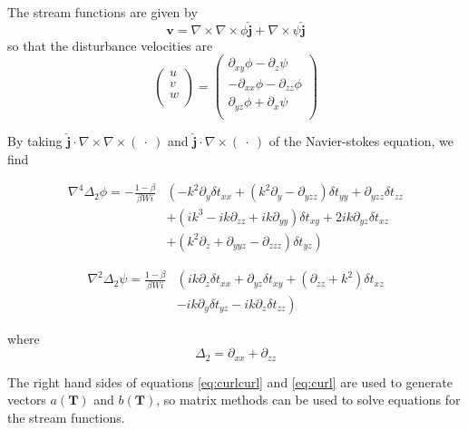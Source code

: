 \documentclass[12pt,a4paper]{article}
\newcommand{\stxx}{\delta t_{xx}}
\newcommand{\styy}{\delta t_{yy}}
\newcommand{\stzz}{\delta t_{zz}}
\newcommand{\stxy}{\delta t_{xy}}
\newcommand{\stxz}{\delta t_{xz}}
\newcommand{\styz}{\delta t_{yz}}
\newcommand{\curl}{\nabla \times}
\newcommand{\biharmop}{\nabla^{4}}
\newcommand{\dd}[1]{\partial_{#1}}
\begin{document}
The stream functions are given by 
\begin{equation}
    \mathbf{v} = \curl \curl \phi \hat{\mathbf{j}} + \curl \psi\hat{\mathbf{j}}
\end{equation}
so that the disturbance velocities are
\begin{equation}
    \begin{pmatrix}
	u \\
	v \\
	w \\
    \end{pmatrix}
    =
    \begin{pmatrix}
    \partial _{xy} \phi - \partial_{z} \psi \\
    -\partial_{xx} \phi - \partial_{zz} \phi \\
    \partial _{yz} \phi + \partial_{x} \psi \\
    \end{pmatrix}
    \label{eq:streamfunction_def}
\end{equation}

By taking $\hat{\mathbf{j}} \cdot \curl \curl (~ \cdot ~) $ and $\hat{\mathbf{j}} \cdot \curl (~ \cdot ~)$ of the Navier-stokes equation, we find

\begin{align}
    \biharmop  \Delta_{2} \phi = - \frac{1-\beta}{\beta Wi} &\left(-k^{2}\dd{y} \stxx + (k^{2}\dd{y} - \dd{yzz})\styy + \dd{yzz} \stzz \right. \nonumber \\ 
   & \left. + (ik^{3} - ik\dd{zz} + ik\dd{yy}) \stxy + 2ik\dd{yz}\stxz \right. \nonumber \\
   & \left. + (k^{2}\dd{z} + \dd{yyz} - \dd{zzz})\styz \right)
\label{eq:curlcurl}
\end{align}

\begin{align}
    \nabla ^{2} \Delta_{2} \psi = \frac{1-\beta}{\beta Wi} &\left( ik\dd{z}\stxx +\dd{yz} \stxy + (\dd{zz} +k^{2})\stxz \right. \nonumber \\ 
    & \left. - ik\dd{y} \styz - ik\dd{z} \stzz \right)
\label{eq:curl}
\end{align}

where
\begin{equation}
    \Delta_{2} = \dd{xx} + \dd{zz}
\end{equation}

The right hand sides of equations \ref{eq:curlcurl} and \ref{eq:curl} are used to generate vectors $a(\mathbf{T})$ and  $b(\mathbf{T})$, so matrix methods can be used to solve equations for the stream functions.
\end{document}
